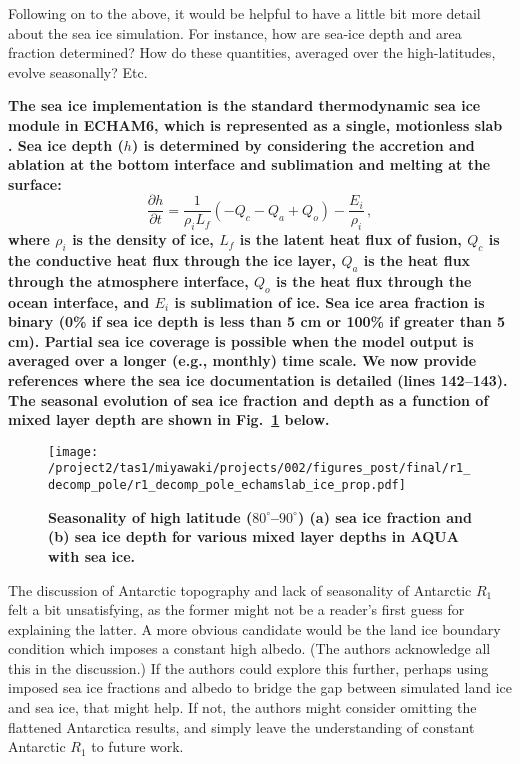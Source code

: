 \documentclass{article}
\begin{document}
Following on to the above, it would be helpful to have a little bit more detail about the sea ice simulation. For instance, how are sea-ice depth and area fraction determined? How do these quantities, averaged over the high-latitudes, evolve seasonally? Etc.

\textbf{The sea ice implementation is the standard thermodynamic sea ice module in ECHAM6, which is represented as a single, motionless slab \citep{semtner1976, giorgetta2013}. Sea ice depth ($h$) is determined by considering the accretion and ablation at the bottom interface and sublimation and melting at the surface:}
\begin{equation}
    \frac{\partial h}{\partial t} = \frac{1}{\rho_i L_f} \left(-Q_c - Q_a + Q_o\right) - \frac{E_i}{\rho_i}\, ,
\end{equation}
\textbf{where $\rho_i$ is the density of ice, $L_f$ is the latent heat flux of fusion, $Q_c$ is the conductive heat flux through the ice layer, $Q_a$ is the heat flux through the atmosphere interface, $Q_o$ is the heat flux through the ocean interface, and $E_i$ is sublimation of ice. Sea ice area fraction is binary (0\% if sea ice depth is less than 5 cm or 100\% if greater than 5 cm). Partial sea ice coverage is possible when the model output is averaged over a longer (e.g., monthly) time scale. We now provide references where the sea ice documentation is detailed (lines 142--143). The seasonal evolution of sea ice fraction and depth as a function of mixed layer depth are shown in Fig.~\ref{fig:echam-sice} below.}

\begin{figure}[H]
    \centering
    \noindent\texttt{[image: /project2/tas1/miyawaki/projects/002/figures\_post/final/r1\_decomp\_pole/r1\_decomp\_pole\_echamslab\_ice\_prop.pdf]}
    \caption{{\bf Seasonality of high latitude ($80^\circ$--$90^\circ$) (a) sea ice fraction and (b) sea ice depth for various mixed layer depths in AQUA with sea ice.}}
    \label{fig:echam-sice}
\end{figure}

The discussion of Antarctic topography and lack of seasonality of Antarctic $R_1$ felt a bit unsatisfying, as the former might not be a reader's first guess for explaining the latter. A more obvious candidate would be the land ice boundary condition which imposes a constant high albedo. (The authors acknowledge all this in the discussion.) If the authors could explore this further, perhaps using imposed sea ice fractions and albedo to bridge the gap between simulated land ice and sea ice, that might help. If not, the authors might consider omitting the flattened Antarctica results, and simply leave the understanding of constant Antarctic $R_1$ to future work.
\end{document}
